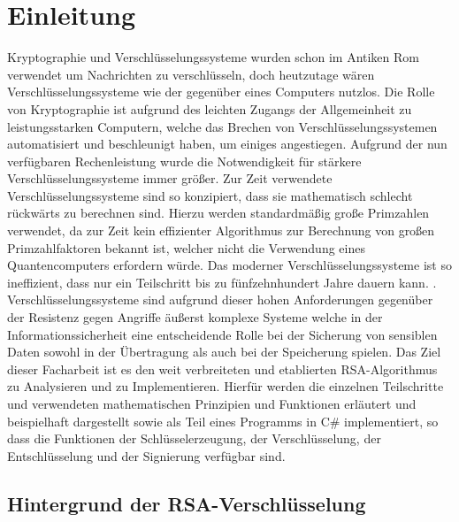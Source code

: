 \chapter{Einleitung}

Kryptographie und Verschlüsselungssysteme wurden schon im Antiken Rom verwendet um Nachrichten zu verschlüsseln\cite{aichner22}, doch heutzutage wären Verschlüsselungssysteme wie der  gegenüber eines Computers nutzlos.
Die Rolle von Kryptographie ist aufgrund des leichten Zugangs der Allgemeinheit zu leistungsstarken Computern, welche das Brechen von  Verschlüsselungssystemen automatisiert und beschleunigt haben, um einiges angestiegen.
Aufgrund der nun verfügbaren Rechenleistung wurde die Notwendigkeit für stärkere Verschlüsselungssysteme immer größer. Zur Zeit verwendete Verschlüsselungssysteme sind so konzipiert, dass sie mathematisch schlecht rückwärts zu berechnen sind.
Hierzu werden standardmäßig große Primzahlen verwendet, da zur Zeit kein effizienter Algorithmus zur Berechnung von großen Primzahlfaktoren bekannt ist, welcher nicht die Verwendung eines Quantencomputers erfordern würde.
Das  moderner Verschlüsselungssysteme ist so ineffizient, dass nur ein Teilschritt bis zu fünfzehnhundert Jahre dauern kann\cite{kleinjung10}.
\cite{kleinjung10}.
Verschlüsselungssysteme sind aufgrund dieser hohen Anforderungen gegenüber der Resistenz gegen Angriffe äußerst komplexe Systeme welche in der Informationssicherheit eine entscheidende Rolle bei der Sicherung von sensiblen Daten sowohl in der Übertragung als auch bei der Speicherung spielen\cite{aichner22}.
Das Ziel dieser Facharbeit ist es den weit verbreiteten und etablierten RSA-Algorithmus zu Analysieren und zu Implementieren. Hierfür werden die einzelnen Teilschritte und verwendeten mathematischen Prinzipien und Funktionen erläutert und beispielhaft dargestellt sowie als Teil eines Programms in C\# implementiert, so dass die Funktionen der Schlüsselerzeugung, der Verschlüsselung, der Entschlüsselung und der Signierung verfügbar sind.
\newpage

\section{Hintergrund der RSA-Verschlüsselung}


